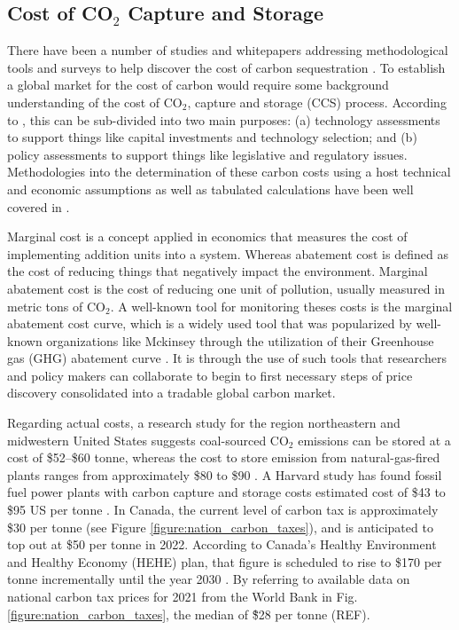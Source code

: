 \documentclass{article}
\begin{document}
\subsection{Cost of CO$_{2}$ Capture and Storage}

There have been a number of studies and whitepapers addressing methodological tools and surveys to help discover the cost of carbon sequestration \cite{Mck09,Gil18,Mck21,Sch20,Dav00,Rub15,Rub07}. To establish a global market for the cost of carbon would require some background understanding of the cost of CO$_{2}$, capture and storage (CCS) process. According to \cite{Rub15}, this can be sub-divided into two main purposes: (a) technology assessments to support things like capital investments and  technology selection; and (b) policy assessments to support things like legislative and regulatory issues. Methodologies into the determination of these carbon costs using a host technical and economic assumptions as well as tabulated calculations have been well covered in \cite{Dav00,Rub07,Rub15}.

Marginal cost is a concept applied in economics that measures the cost of implementing addition units into a system. Whereas abatement cost is defined as the cost of reducing things that negatively impact the environment. Marginal abatement cost is the cost of reducing one unit of pollution, usually measured in metric tons of CO$_{2}$. A well-known tool for monitoring theses costs is the marginal abatement cost curve, which is a widely used tool that was popularized by well-known organizations like Mckinsey through the utilization of their Greenhouse gas (GHG) abatement curve \cite{Mck09}. It is through the use of such tools that researchers and policy makers can collaborate to begin to first necessary steps of price discovery consolidated into a tradable global carbon market. 

Regarding actual costs, a research study for the region northeastern and midwestern United States  suggests coal-sourced CO$_{2}$ emissions can be stored at a cost of \$52–\$60 tonne, whereas the cost to store emission from natural-gas-fired plants ranges from approximately \$80 to \$90 \cite{Sch20}. A Harvard study has found fossil fuel power plants with carbon capture and storage costs estimated cost of \$43 to \$95 US per tonne \cite{Gil18}. In Canada, the current level of carbon tax is approximately \$30 per tonne (see Figure \ref{figure:nation_carbon_taxes}), and is anticipated to top out at \$50 per tonne in 2022. According to Canada's Healthy Environment and Healthy Economy (HEHE) plan, that figure is scheduled to rise to \$170 per tonne incrementally until the year 2030 \cite{Mck21}. By referring to available data on national carbon tax prices for 2021 from the World Bank in Fig. \ref{figure:nation_carbon_taxes}, the median of \~ \$28 per tonne (REF).
\end{document}
